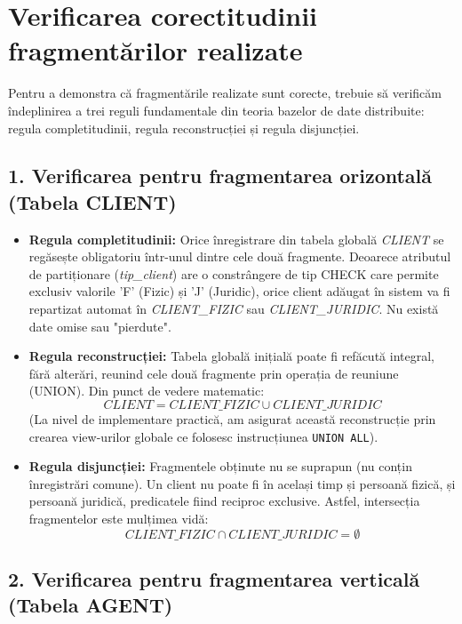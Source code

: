 \chapter{Verificarea corectitudinii fragmentărilor realizate}

Pentru a demonstra că fragmentările realizate sunt corecte, trebuie să verificăm îndeplinirea a trei reguli fundamentale din teoria bazelor de date distribuite: regula completitudinii, regula reconstrucției și regula disjuncției.

\section*{1. Verificarea pentru fragmentarea orizontală (Tabela CLIENT)}

\begin{itemize}
    \item \textbf{Regula completitudinii:} Orice înregistrare din tabela globală \textit{CLIENT} se regăsește obligatoriu într-unul dintre cele două fragmente. Deoarece atributul de partiționare (\textit{tip\_client}) are o constrângere de tip CHECK care permite exclusiv valorile 'F' (Fizic) și 'J' (Juridic), orice client adăugat în sistem va fi repartizat automat în \textit{CLIENT\_FIZIC} sau \textit{CLIENT\_JURIDIC}. Nu există date omise sau "pierdute".
    \item \textbf{Regula reconstrucției:} Tabela globală inițială poate fi refăcută integral, fără alterări, reunind cele două fragmente prin operația de reuniune (UNION). Din punct de vedere matematic: 
    $$CLIENT = CLIENT\_FIZIC \cup CLIENT\_JURIDIC$$
    (La nivel de implementare practică, am asigurat această reconstrucție prin crearea view-urilor globale ce folosesc instrucțiunea \texttt{UNION ALL}).
    \item \textbf{Regula disjuncției:} Fragmentele obținute nu se suprapun (nu conțin înregistrări comune). Un client nu poate fi în același timp și persoană fizică, și persoană juridică, predicatele fiind reciproc exclusive. Astfel, intersecția fragmentelor este mulțimea vidă:
    $$CLIENT\_FIZIC \cap CLIENT\_JURIDIC = \emptyset$$
\end{itemize}

\section*{2. Verificarea pentru fragmentarea verticală (Tabela AGENT)}

